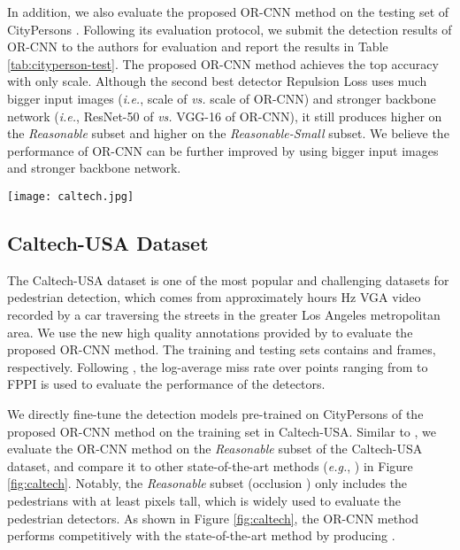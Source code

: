 \documentclass[runningheads]{llncs}
\def\ie{{\em i.e.}}
\def\eg{{\em e.g.}}
\begin{document}
In addition, we also evaluate the proposed OR-CNN method on the testing set of CityPersons \cite{DBLP:conf/cvpr/ZhangBS17}. Following its evaluation protocol, we submit the detection results of OR-CNN to the authors for evaluation and report the results in Table \ref{tab:cityperson-test}. The proposed OR-CNN method achieves the top accuracy with only  scale. Although the second best detector Repulsion Loss \cite{DBLP:journals/corr/abs-1711-07752} uses much bigger input images (\ie,  scale of \cite{DBLP:journals/corr/abs-1711-07752} {\em vs.}  scale of OR-CNN) and stronger backbone network (\ie, ResNet-50 of \cite{DBLP:journals/corr/abs-1711-07752} {\em vs.} VGG-16 of OR-CNN), it still produces  higher  on the {\em Reasonable} subset and  higher  on the {\em Reasonable-Small} subset. We believe the performance of  OR-CNN can be further improved by using bigger input images and stronger backbone network.

\begin{figure*}[t]
\centering
\texttt{[image: caltech.jpg]}
\caption{Comparisons with the state-of-the-art methods on the Caltech-USA dataset. The scores in the legend are the  scores of the corresponding methods.}
\label{fig:caltech}
\end{figure*}


\subsection{Caltech-USA Dataset}
The Caltech-USA dataset \cite{DBLP:journals/pami/DollarWSP12} is one of the most popular and challenging datasets for pedestrian detection, which comes from approximately  hours Hz VGA video recorded by a car traversing the streets in the greater Los Angeles metropolitan area. We use the new high quality annotations provided by \cite{DBLP:conf/cvpr/ZhangBOHS16} to evaluate the proposed OR-CNN method. The training and testing sets contains  and  frames, respectively. Following \cite{DBLP:journals/pami/DollarWSP12}, the log-average miss rate over  points ranging from  to  FPPI is used to evaluate the performance of the detectors.

We directly fine-tune the detection models pre-trained on CityPersons \cite{DBLP:conf/cvpr/ZhangBS17} of the proposed OR-CNN method on the training set in Caltech-USA. Similar to \cite{DBLP:journals/corr/abs-1711-07752}, we evaluate the OR-CNN method on the {\em Reasonable} subset of the Caltech-USA dataset, and compare it to other state-of-the-art methods (\eg, \cite{DBLP:journals/corr/abs-1711-07752,DBLP:conf/cvpr/ZhangBS15,DBLP:conf/cvpr/TianLWT15,DBLP:conf/eccv/CaiFFV16,DBLP:conf/iccv/CaiSV15,DBLP:conf/eccv/ZhangLLH16,DBLP:conf/cvpr/MaoXJC17,DBLP:journals/tm/li2017scale,DBLP:conf/iccv/TianLWT15,DBLP:conf/cvpr/CosteaN16,DBLP:conf/icpr/Ohn-BarT16a,DBLP:conf/wacv/DuELD17}) in Figure \ref{fig:caltech}. Notably, the {\em Reasonable} subset (occlusion ) only includes the pedestrians with at least  pixels tall, which is widely used to evaluate the pedestrian detectors. As shown in Figure \ref{fig:caltech}, the OR-CNN method performs competitively with the state-of-the-art method \cite{DBLP:journals/corr/abs-1711-07752} by producing  .
\end{document}
